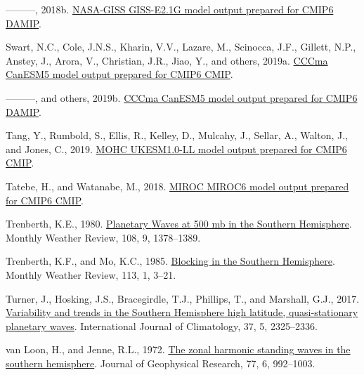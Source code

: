 \documentclass[12pt,oneside]{reedthesis}
\newlength{\cslhangindent}
\newenvironment{CSLReferences}[2] %
 {%
  \setlength{\parindent}{0pt}
  \ifodd #1 \everypar{\setlength{\hangindent}{\cslhangindent}}\ignorespaces\fi
  \ifnum #2 > 0
  \setlength{\parskip}{#2\baselineskip}
  \fi
 }%
 {}
\begin{document}
\begin{CSLReferences}{1}{0}
\leavevmode{}%
---------, 2018b. \href{https://doi.org/10.22033/ESGF/CMIP6.2062}{NASA-GISS GISS-E2.1G model output prepared for CMIP6 DAMIP}.

\leavevmode{}%
Swart, N.C., Cole, J.N.S., Kharin, V.V., Lazare, M., Scinocca, J.F., Gillett, N.P., Anstey, J., Arora, V., Christian, J.R., Jiao, Y., and others, 2019a. \href{https://doi.org/10.22033/ESGF/CMIP6.1303}{CCCma CanESM5 model output prepared for CMIP6 CMIP}.

\leavevmode{}%
---------, and others, 2019b. \href{https://doi.org/10.22033/ESGF/CMIP6.1305}{CCCma CanESM5 model output prepared for CMIP6 DAMIP}.

\leavevmode{}%
Tang, Y., Rumbold, S., Ellis, R., Kelley, D., Mulcahy, J., Sellar, A., Walton, J., and Jones, C., 2019. \href{https://doi.org/10.22033/ESGF/CMIP6.1569}{MOHC UKESM1.0-LL model output prepared for CMIP6 CMIP}.

\leavevmode{}%
Tatebe, H., and Watanabe, M., 2018. \href{https://doi.org/10.22033/ESGF/CMIP6.881}{MIROC MIROC6 model output prepared for CMIP6 CMIP}.

\leavevmode{}%
Trenberth, K.E., 1980. \href{https://doi.org/10.1175/1520-0493(1980)108\%3C1378:PWAMIT\%3E2.0.CO;2}{Planetary {Waves} at 500 mb in the {Southern Hemisphere}}. Monthly Weather Review, 108, 9, 1378--1389.

\leavevmode{}%
Trenberth, K.F., and Mo, K.C., 1985. \href{https://doi.org/10.1175/1520-0493(1985)113\%3C0003:BITSH\%3E2.0.CO;2}{Blocking in the {Southern Hemisphere}}. Monthly Weather Review, 113, 1, 3--21.

\leavevmode{}%
Turner, J., Hosking, J.S., Bracegirdle, T.J., Phillips, T., and Marshall, G.J., 2017. \href{https://doi.org/10.1002/joc.4848}{Variability and trends in the {Southern Hemisphere} high latitude, quasi-stationary planetary waves}. International Journal of Climatology, 37, 5, 2325--2336.

\leavevmode{}%
van Loon, H., and Jenne, R.L., 1972. \href{https://doi.org/10.1029/JC077i006p00992}{The zonal harmonic standing waves in the southern hemisphere}. Journal of Geophysical Research, 77, 6, 992--1003.


\end{CSLReferences}
\end{document}
